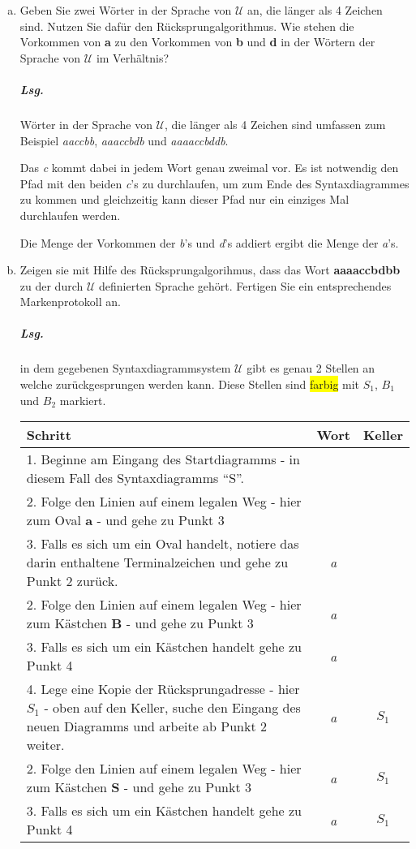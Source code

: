 \documentclass{scrreprt}
\begin{document}
\begin{enumerate}[(a)]
\item Geben Sie zwei Wörter in der Sprache von $\mathcal{U}$ an, die länger als
  4 Zeichen sind.
  Nutzen Sie dafür den Rücksprungalgorithmus.
  Wie stehen die Vorkommen von \textbf{a} zu den Vorkommen von \textbf{b} und
  \textbf{d} in der Wörtern der Sprache von $\mathcal{U}$ im Verhältnis?

  \subparagraph{Lsg.} Wörter in der Sprache von $\mathcal{U}$, die länger als
  4 Zeichen sind umfassen zum Beispiel \emph{aaccbb}, \emph{aaaccbdb} und
  \emph{aaaaccbddb}.

  Das \emph{c} kommt dabei in jedem Wort genau zweimal vor.
  Es ist notwendig den Pfad mit den beiden \emph{c}'s zu durchlaufen, um zum
  Ende des Syntaxdiagrammes zu kommen und gleichzeitig kann dieser Pfad nur ein
  einziges Mal durchlaufen werden.

  Die Menge der Vorkommen der \emph{b}'s und \emph{d}'s addiert ergibt die Menge
  der \emph{a}'s.

\item Zeigen sie mit Hilfe des Rücksprungalgorihmus, dass das Wort
  \textbf{aaaaccbdbb} zu der durch $\mathcal{U}$ definierten Sprache gehört.
  Fertigen Sie ein entsprechendes Markenprotokoll an.

  \subparagraph{Lsg.} in dem gegebenen Syntaxdiagrammsystem $\mathcal{U}$ gibt
  es genau 2 Stellen an welche zurückgesprungen werden kann.
  Diese Stellen sind \colorbox{yellow}{farbig} mit $S_1$, $B_1$ und $B_2$
  markiert.

  \begin{small}
  \begin{tabularx}{\linewidth}{X|c|c}
    \textbf{Schritt} & \textbf{Wort} & \textbf{Keller} \\
    \hline
    1. Beginne am Eingang des Startdiagramms - in diesem Fall des
    Syntaxdiagramms ``S''. & & \\
    2. Folge den Linien auf einem legalen Weg - hier zum Oval \textbf{a} - und
    gehe zu Punkt 3 & & \\
    3. Falls es sich um ein Oval handelt, notiere das darin enthaltene
    Terminalzeichen und gehe zu Punkt 2 zurück. & \emph{a} & \\
    2. Folge den Linien auf einem legalen Weg - hier zum Kästchen \textbf{B} -
    und gehe zu Punkt 3 & \emph{a} & \\
    3. Falls es sich um ein Kästchen handelt gehe zu Punkt 4 & \emph{a} & \\
    4. Lege eine Kopie der Rücksprungadresse - hier $S_1$ - oben auf den Keller,
    suche den Eingang des neuen Diagramms und arbeite ab Punkt 2 weiter. &
    \emph{a} & $S_1$ \\
    2. Folge den Linien auf einem legalen Weg - hier zum Kästchen \textbf{S} -
    und gehe zu Punkt 3 & \emph{a} & $S_1$ \\
    3. Falls es sich um ein Kästchen handelt gehe zu Punkt 4 & \emph{a} &
    $S_1$ \\
  \end{tabularx}
  \end{small}


\end{enumerate}
\end{document}

